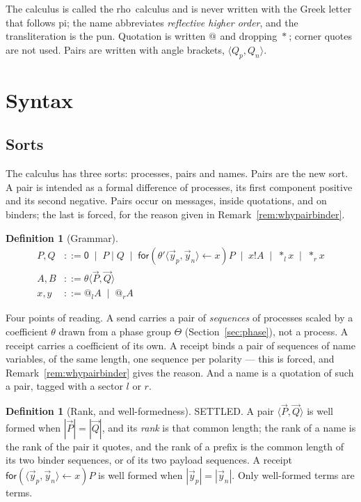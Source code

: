 \documentclass[11pt]{article}
\makeatletter
\theoremstyle{definition}
\newtheorem{definition}[theorem]{Definition}
\theoremstyle{remark}
\newcommand{\rhoc}{\textsf{rho}}
\newcommand{\pzero}{\mathsf{0}}
\newcommand{\quo}[1]{\ensuremath{@_{#1}}}
\newcommand{\drp}[1]{\ensuremath{*_{#1}}}
\newcommand{\dip}[2]{\ensuremath{\langle #1 , #2 \rangle}}
\makeatother
\begin{document}
The calculus is called the \rhoc\ calculus and is never written with the Greek
letter that follows pi; the name abbreviates \emph{reflective higher order},
and the transliteration is the pun. Quotation is written \quo{} and dropping
\drp{}; corner quotes are not used. Pairs are written with angle brackets,
$\dip{Q_p}{Q_n}$.

\section{Syntax}
\label{sec:syntax}

\subsection{Sorts}

The calculus has three sorts: processes, pairs and names. Pairs are the new
sort. A pair is intended as a formal difference of processes, its first
component positive and its second negative. Pairs occur on messages, inside
quotations, and on binders; the last is forced, for the reason given in
Remark~\ref{rem:whypairbinder}.

\begin{definition}[Grammar]
\label{def:grammar}
\begin{align*}
  P, Q &::= \pzero \;\mid\; P \mid Q \;\mid\;
            \mathsf{for}(\theta'\dip{\vec{y}_p}{\vec{y}_n} \leftarrow x)P \;\mid\;
            x!A \;\mid\; \drp{l}x \;\mid\; \drp{r}x \\
  A, B &::= \theta\dip{\vec{P}}{\vec{Q}} \\
  x, y &::= \quo{l}A \;\mid\; \quo{r}A
\end{align*}
\end{definition}

Four points of reading. A send carries a pair of \emph{sequences} of processes
scaled by a coefficient $\theta$ drawn from a phase group $\Theta$
(Section~\ref{sec:phase}), not a process. A receipt carries a coefficient of its
own. A receipt binds a pair of sequences of name variables, of the
same length, one sequence per polarity --- this is forced, and
Remark~\ref{rem:whypairbinder} gives the reason. And a name is a quotation of
such a pair, tagged with a sector $l$ or $r$.

\begin{definition}[Rank, and well-formedness]
\label{def:rank}
SETTLED. A pair $\dip{\vec{P}}{\vec{Q}}$ is well formed when
$|\vec{P}| = |\vec{Q}|$, and its \emph{rank} is that common length; the rank of a
name is the rank of the pair it quotes, and the rank of a prefix is the common
length of its two binder sequences, or of its two payload sequences. A receipt
$\mathsf{for}(\dip{\vec{y}_p}{\vec{y}_n} \leftarrow x)P$ is well formed when
$|\vec{y}_p| = |\vec{y}_n|$. Only well-formed terms are terms.
\end{definition}
\end{document}
